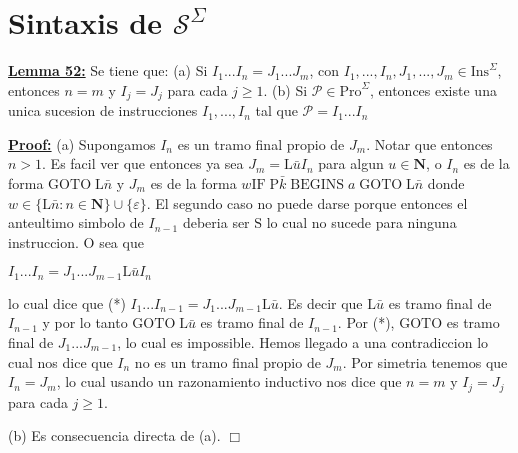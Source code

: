 \section{Sintaxis de $\mathcal{S}^{\Sigma}$}

\textbf{\underline{Lemma 52:}} Se tiene que:
(a) Si \(I_{1}...I_{n}=J_{1}...J_{m}\), con \( I_{1},...,I_{n},J_{1},...,J_{m}\in \mathrm{Ins}^{\Sigma }\), entonces \(n=m\) y \(I_{j}=J_{j}\) para cada \(j\geq 1\).
(b) Si \(\mathcal{P}\in \mathrm{Pro}^{\Sigma }\), entonces existe una unica sucesion de instrucciones \(I_{1},...,I_{n}\) tal que \(\mathcal{P} =I_{1}...I_{n}\)


\textbf{\underline{Proof:}} (a) Supongamos \(I_{n}\) es un tramo final propio de \(J_{m}.\) Notar que entonces \(n >1\). Es facil ver que entonces ya sea \(J_{m}=\mathrm{L}\bar{u} I_{n}\) para algun \(u\in \mathbf{N}\), o \(I_{n}\) es de la forma \(\mathrm{GOTO} \;\mathrm{L}\bar{n}\) y \(J_{m}\) es de la forma \(w\mathrm{IF}\;\mathrm{P}\bar{k }\;\mathrm{BEGINS}\;a\;\mathrm{GOTO}\;\mathrm{L}\bar{n}\) donde \(w\in \{ \mathrm{L}\bar{n}:n\in \mathbf{N}\}\cup \{\varepsilon \}\). El segundo caso no puede darse porque entonces el anteultimo simbolo de \(I_{n-1}\) deberia ser \(\mathrm{S}\) lo cual no sucede para ninguna instruccion. O sea que

\(\displaystyle I_{1}...I_{n}=J_{1}...J_{m-1}\mathrm{L}\bar{u}I_{n} \)

lo cual dice que
(*) \(I_{1}...I_{n-1}=J_{1}...J_{m-1}\mathrm{L}\bar{u}.\)
Es decir que \(\mathrm{L}\bar{u}\) es tramo final de \(I_{n-1}\) y por lo tanto \(\mathrm{GOTO}\;\mathrm{L}\bar{u}\) es tramo final de \(I_{n-1}.\) Por (*), \(\mathrm{GOTO}\) es tramo final de \(J_{1}...J_{m-1}\), lo cual es impossible. Hemos llegado a una contradiccion lo cual nos dice que \(I_{n}\) no es un tramo final propio de \(J_{m}.\) Por simetria tenemos que \( I_{n}=J_{m} \), lo cual usando un razonamiento inductivo nos dice que \(n=m\) y \(I_{j}=J_{j} \) para cada \(j\geq 1\).

(b) Es consecuencia directa de (a). \(\Box\)
